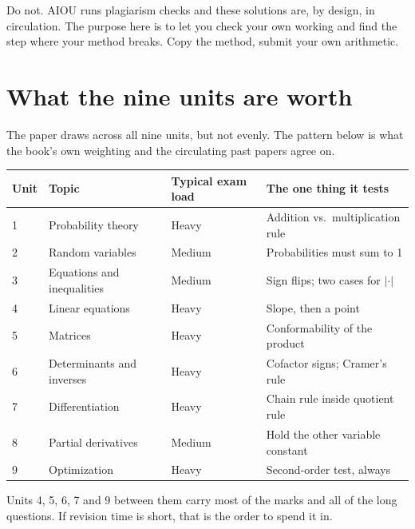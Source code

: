 \begin{pitfall}
Do not. AIOU runs plagiarism checks and these solutions are, by design, in
circulation. The purpose here is to let you check your own working and find the
step where your method breaks. Copy the method, submit your own arithmetic.
\end{pitfall}

\section*{What the nine units are worth}

The paper draws across all nine units, but not evenly. The pattern below is
what the book's own weighting and the circulating past papers agree on.

\begin{center}
\small\sffamily
\begin{tabular}{@{}L{1.1cm} L{5.2cm} L{4.0cm} L{4.4cm}@{}}
\toprule
\textbf{Unit} & \textbf{Topic} & \textbf{Typical exam load} & \textbf{The one thing it tests} \\
 & Probability theory        & Heavy   & Addition vs.\ multiplication rule \\
2 & Random variables          & Medium  & Probabilities must sum to 1 \\
3 & Equations and inequalities& Medium  & Sign flips; two cases for $|\cdot|$ \\
4 & Linear equations          & Heavy   & Slope, then a point \\
5 & Matrices                  & Heavy   & Conformability of the product \\
6 & Determinants and inverses & Heavy   & Cofactor signs; Cramer's rule \\
7 & Differentiation           & Heavy   & Chain rule inside quotient rule \\
8 & Partial derivatives       & Medium  & Hold the other variable constant \\
9 & Optimization              & Heavy   & Second-order test, always \\
\bottomrule
\end{tabular}
\end{center}

\vspace{6pt}
\noindent
Units 4, 5, 6, 7 and 9 between them carry most of the marks and all of the
long questions. If revision time is short, that is the order to spend it in.

\clearpage
\tableofcontents
\clearpage
{}
\setcounter{page}{1}
